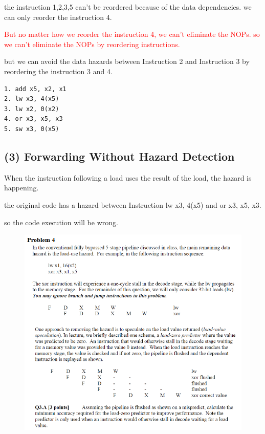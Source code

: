 \documentclass[cn,12pt]{homework}
\begin{document}
\begin{solution}
the instruction 1,2,3,5 can't be reordered because of the data dependencies.
we can only reorder the instruction 4.

\textcolor{red}{But no matter how we reorder the instruction 4, we can't eliminate the NOPs.
so we can't eliminate the NOPs by reordering instructions.
}

but we can avoid the data hazards between Instruction 2 and Instruction 3
by reordering the instruction 3 and 4.
\begin{verbatim}
1. add x5, x2, x1
2. lw x3, 4(x5)
3. lw x2, 0(x2)
4. or x3, x5, x3
5. sw x3, 0(x5)
\end{verbatim}

\subsection*{(3) Forwarding Without Hazard Detection}

When the instruction following a load uses the result of the load,
the hazard is happening.

the original code has a hazard between Instruction lw x3, 4(x5) and or x3, x5, x3.

so the code execution will be wrong.

\end{solution}
\begin{problem}
  \quad
  \begin{figure}[H]
    \centering
    \includegraphics[width=1\textwidth]{./figures/image4.png}
    \label{fig:pro1}
  \end{figure}

\end{problem}
\end{document}
